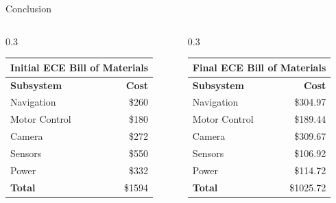 \documentclass[final]{beamer}
\newlength{\colwidth}
\begin{document}
\begin{frame}[t]
\begin{columns}[t]
\begin{column}{\colwidth}
\begin{block}{Conclusion}
\begin{columns}[t]
    \begin{column}{0.3\colwidth}
      \begin{table}[ht]
        \begin{center}
          \label{tab:table1}
          \begin{tabular}{l|r} %
            \toprule
            \multicolumn{2}{c}{\textbf{Initial ECE Bill of Materials}} \\
            \midrule
            \cellcolor{white}\textbf{Subsystem} & \cellcolor{white}\textbf{Cost} \\
            \midrule
            Navigation & \$260 \\
            Motor Control & \$180 \\
            Camera & \$272 \\
            Sensors & \$550 \\
            Power & \$332 \\
            \cellcolor{white}\textbf{Total} & \cellcolor{white}\$1594 \\
            \bottomrule
          \end{tabular}
        \end{center}
      \end{table}    
    \end{column}

    
    \begin{column}{0.3\colwidth}
      \begin{table}[ht]
        \begin{center}
          \label{tab:table1}
          \begin{tabular}{l|r} %
            \toprule
            \multicolumn{2}{c}{\textbf{Final ECE Bill of Materials}} \\
            \midrule
            \cellcolor{white}\textbf{Subsystem} & \cellcolor{white}\textbf{Cost} \\
            \midrule
            Navigation & \$304.97 \\
            Motor Control & \$189.44 \\
            Camera & \$309.67 \\
            Sensors & \$106.92 \\
            Power & \$114.72 \\
            \cellcolor{white}\textbf{Total} & \cellcolor{white}\$1025.72 \\
            \bottomrule
          \end{tabular}
        \end{center}
      \end{table}    
    \end{column}



\end{columns}
\end{block}
\end{column}
\end{columns}
\end{frame}
\end{document}

